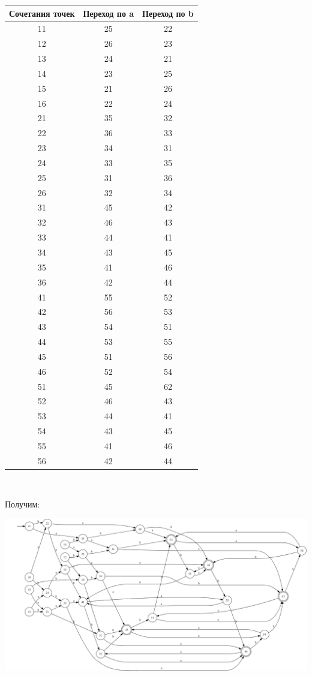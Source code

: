 \documentclass{article}
\begin{document}
    \begin{center}
        \begin{tabular}{|c|c|c|}
            \hline
            Сочетания точек & Переход по a & Переход по b \\
            \hline
            11 & 25 & 22\\
            12 & 26 & 23\\
            13 & 24 & 21\\
            14 & 23 & 25\\
            15 & 21 & 26\\
            16 & 22 & 24\\
            21 & 35 & 32\\
            22 & 36 & 33\\
            23 & 34 & 31\\
            24 & 33 & 35\\
            25 & 31 & 36\\
            26 & 32 & 34\\
            31 & 45 & 42\\
            32 & 46 & 43\\
            33 & 44 & 41\\
            34 & 43 & 45\\
            35 & 41 & 46\\
            36 & 42 & 44\\
            41 & 55 & 52\\
            42 & 56 & 53\\
            43 & 54 & 51\\
            44 & 53 & 55\\
            45 & 51 & 56\\
            46 & 52 & 54\\
            51 & 45 & 62\\
            52 & 46 & 43\\
            53 & 44 & 41\\
            54 & 43 & 45\\
            55 & 41 & 46\\
            56 & 42 & 44\\
            \hline
        \end{tabular}\\
    \end{center}
    Получим:
    \begin{center}
        \includegraphics[width=1\textwidth]{task2/pic5.3}\\
    \end{center}
    
\end{document}
